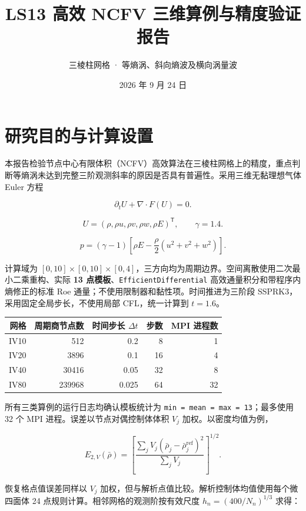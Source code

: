 \documentclass[
  a4paper,
]{ctexart}
\title{LS13 高效 NCFV 三维算例与精度验证报告}
\subtitle{三棱柱网格 · 等熵涡、斜向熵波及横向涡量波}
\author{}
\date{2026 年 9 月 24 日}
\begin{document}
\maketitle

\hypertarget{ux7814ux7a76ux76eeux7684ux4e0eux8ba1ux7b97ux8bbeux7f6e}{%
\section{研究目的与计算设置}\label{ux7814ux7a76ux76eeux7684ux4e0eux8ba1ux7b97ux8bbeux7f6e}}

本报告检验节点中心有限体积（NCFV）高效算法在三棱柱网格上的精度，重点判断等熵涡未达到完整三阶观测斜率的原因是否具有普遍性。采用三维无黏理想气体
Euler 方程

\[
\partial_t U+\nabla\cdot F(U)=0.
\]

\[
U=(\rho,\rho u,\rho v,\rho w,\rho E)^\mathsf{T},\qquad \gamma=1.4.
\]

\[
p=(\gamma-1)\left[\rho E-\frac{\rho}{2}(u^2+v^2+w^2)\right].
\]

计算域为
\([0,10]\times[0,10]\times[0,4]\)，三方向均为周期边界。空间离散使用二次最小二乘重构、实际
\textbf{13 点模板}、\texttt{EfficientDifferential}
高效通量积分和带程序内熵修正的标准 Roe
通量；不使用限制器和黏性项。时间推进为三阶段
SSPRK3，采用固定全局步长，不使用局部 CFL，统一计算到 \(t=1.6\)。

\begin{longtable}[]{@{}rrrrr@{}}
\toprule\noalign{}
网格 & 周期商节点数 & 时间步长 \(\Delta t\) & 步数 & MPI 进程数 \\
\midrule\noalign{}
\endhead
\bottomrule\noalign{}
\endlastfoot
IV10 & 512 & 0.2 & 8 & 1 \\
IV20 & 3896 & 0.1 & 16 & 4 \\
IV40 & 30416 & 0.05 & 32 & 8 \\
IV80 & 239968 & 0.025 & 64 & 32 \\
\end{longtable}

所有三类算例的运行日志均确认模板统计为
\texttt{min\ =\ mean\ =\ max\ =\ 13}；最多使用 32 个 MPI
进程。误差以节点对偶控制体体积 \(V_j\) 加权。以密度均值为例，

\[
E_{2,V}(\bar\rho)=\left[\frac{\sum_j V_j(\bar\rho_j-\bar\rho_j^{\mathrm{ref}})^2}{\sum_j V_j}\right]^{1/2}.
\]

恢复格点值误差同样以 \(V_j\)
加权，但与解析点值比较。解析控制体均值使用每个微四面体 24
点规则计算。相邻网格的观测阶按有效尺度 \(h_n=(400/N_n)^{1/3}\) 求得：
\end{document}
